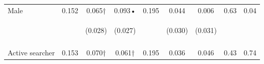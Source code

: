 \begin{table}[h!]
{\begin{tabular}{lcccccccc}
\noalign{\smallskip}Male & 0.152 & 0.065† & 0.093• & 0.195 & 0.044 & 0.006 & 0.63 & 0.04\\
 & \begin{footnotesize}\end{footnotesize} & \begin{footnotesize}(0.028)\end{footnotesize} & \begin{footnotesize}(0.027)\end{footnotesize} & \begin{footnotesize}\end{footnotesize} & \begin{footnotesize}(0.030)\end{footnotesize} & \begin{footnotesize}(0.031)\end{footnotesize} & \begin{footnotesize}\end{footnotesize} & \begin{footnotesize}\end{footnotesize}\\
 & \begin{footnotesize}\end{footnotesize} & \begin{footnotesize}[0.021]\end{footnotesize} & \begin{footnotesize}[0.004]\end{footnotesize} & \begin{footnotesize}\end{footnotesize} & \begin{footnotesize}[0.505]\end{footnotesize} & \begin{footnotesize}[1.000]\end{footnotesize} & \begin{footnotesize}\end{footnotesize} & \begin{footnotesize}\end{footnotesize}\\
\noalign{\smallskip}Active searcher & 0.153 & 0.070† & 0.061† & 0.195 & 0.036 & 0.046 & 0.43 & 0.74\\

\end{tabular}}
\end{table}
